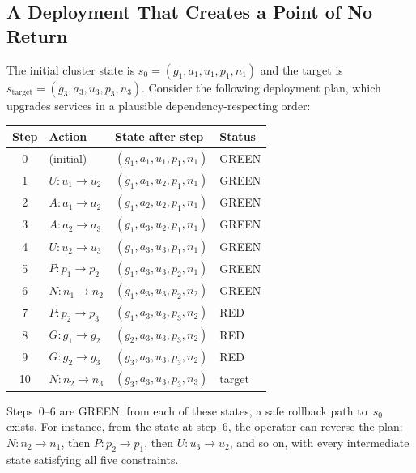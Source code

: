 \documentclass[10pt,twocolumn]{article}
\begin{document}
\subsection{A Deployment That Creates a Point of No Return}
\label{sec:motivation:ponr}

The initial cluster state is $s_0 = (g_1, a_1, u_1, p_1, n_1)$ and the
target is $s_{\mathrm{target}} = (g_3, a_3, u_3, p_3, n_3)$.  Consider
the following deployment plan, which upgrades services in a plausible
dependency-respecting order:

\begin{center}
\begin{tabular}{clll}
\toprule
\textbf{Step} & \textbf{Action} & \textbf{State after step} & \textbf{Status} \\
\midrule
0 & (initial)            & $(g_1, a_1, u_1, p_1, n_1)$ & \textcolor{green!60!black}{\textsf{GREEN}} \\
1 & $U: u_1 \to u_2$    & $(g_1, a_1, u_2, p_1, n_1)$ & \textcolor{green!60!black}{\textsf{GREEN}} \\
2 & $A: a_1 \to a_2$    & $(g_1, a_2, u_2, p_1, n_1)$ & \textcolor{green!60!black}{\textsf{GREEN}} \\
3 & $A: a_2 \to a_3$    & $(g_1, a_3, u_2, p_1, n_1)$ & \textcolor{green!60!black}{\textsf{GREEN}} \\
4 & $U: u_2 \to u_3$    & $(g_1, a_3, u_3, p_1, n_1)$ & \textcolor{green!60!black}{\textsf{GREEN}} \\
5 & $P: p_1 \to p_2$    & $(g_1, a_3, u_3, p_2, n_1)$ & \textcolor{green!60!black}{\textsf{GREEN}} \\
6 & $N: n_1 \to n_2$    & $(g_1, a_3, u_3, p_2, n_2)$ & \textcolor{green!60!black}{\textsf{GREEN}} \\
7 & $P: p_2 \to p_3$    & $(g_1, a_3, u_3, p_3, n_2)$ & \textcolor{red!70!black}{\textsf{RED}} \\
8 & $G: g_1 \to g_2$    & $(g_2, a_3, u_3, p_3, n_2)$ & \textcolor{red!70!black}{\textsf{RED}} \\
9 & $G: g_2 \to g_3$    & $(g_3, a_3, u_3, p_3, n_2)$ & \textcolor{red!70!black}{\textsf{RED}} \\
10 & $N: n_2 \to n_3$   & $(g_3, a_3, u_3, p_3, n_3)$ & target \\
\bottomrule
\end{tabular}
\end{center}

\noindent
Steps~0--6 are GREEN: from each of these states, a safe rollback path
to~$s_0$ exists.  For instance, from the state at step~6, the operator can
reverse the plan: $N\!: n_2 \to n_1$, then $P\!: p_2 \to p_1$, then
$U\!: u_3 \to u_2$, and so on, with every intermediate state satisfying
all five constraints.
\end{document}
